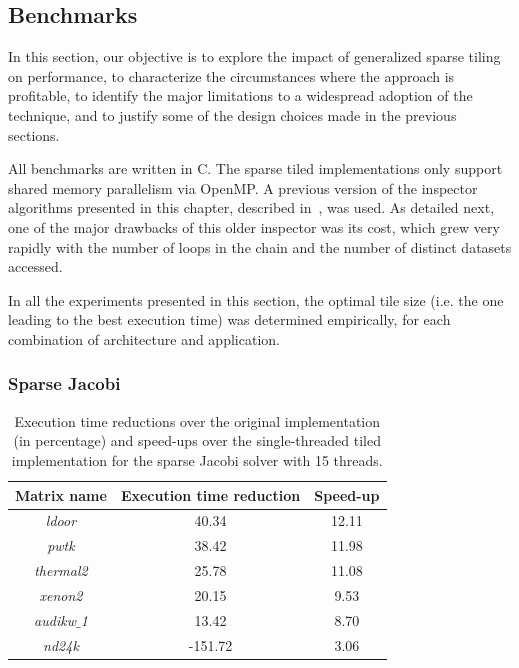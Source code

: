 

\subsection{Benchmarks}
In this section, our objective is to explore the impact of generalized sparse tiling on performance, to characterize the circumstances where the approach is profitable, to identify the major limitations to a widespread adoption of the technique, and to justify some of the design choices made in the previous sections.

All benchmarks are written in C. The sparse tiled implementations only support shared memory parallelism via OpenMP. A previous version of the inspector algorithms presented in this chapter, described in~\cite{st-paper}, was used. As detailed next, one of the major drawbacks of this older inspector was its cost, which grew very rapidly with the number of loops in the chain and the number of distinct datasets accessed. 

In all the experiments presented in this section, the optimal tile size (i.e. the one leading to the best execution time) was determined empirically, for each combination of architecture and application. 

\subsubsection{Sparse Jacobi}

\begin{table}[t]
\centering
\begin{tabulary}{1.0\columnwidth}{c | c | c}
\hline
Matrix name & Execution time reduction & Speed-up  \\
\hline
{\em ldoor} & 40.34 & 12.11 \\
{\em pwtk} & 38.42 & 11.98 \\
{\em thermal2} & 25.78 & 11.08 \\
{\em xenon2} & 20.15 & 9.53 \\
{\em audikw$\_$1} & 13.42 & 8.70 \\
{\em nd24k} & -151.72 & 3.06 \\
\hline
\end{tabulary}
\caption{Execution time reductions over the original implementation (in percentage) and speed-ups over the single-threaded tiled implementation for the sparse Jacobi solver with 15 threads.}
\label{table:st-jacobi}
\end{table}

